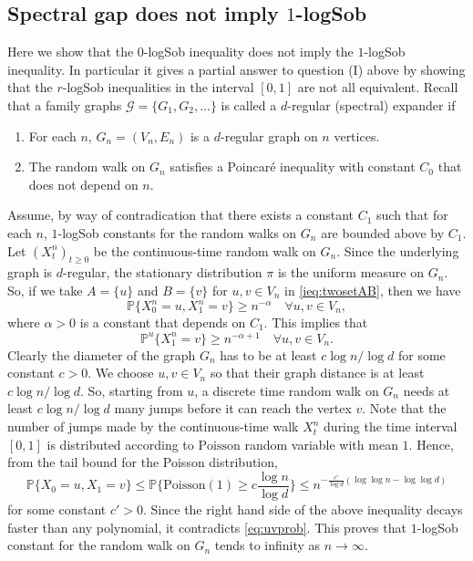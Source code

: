 \documentclass[11pt]{amsart}
\newcommand{\PP}{\mathbb{P}}
\newcommand{\1}{\mathbf{1}}
\theoremstyle{definition}
\theoremstyle{plain}
\theoremstyle{remark}
\numberwithin{equation}{section}
\begin{document}
\subsection{Spectral gap does not imply $1$-logSob}
Here we show that the $0$-logSob inequality does not imply the $1$-logSob inequality. In particular it gives a partial answer to question (I) above
by showing that the $r$-logSob inequalities in the interval $[0,1]$ are not all equivalent. 
Recall that a family graphs $\mathcal{G} = \{ G_1, G_2, \ldots \}$ is called a $d$-regular (spectral) expander if
\begin{enumerate}
\item  For each $n$, $G_n =(V_n, E_n)$ is a $d$-regular graph on $n$ vertices.
\item  The random walk on $G_n$ satisfies a Poincar\'{e} inequality with constant $C_0$ that does not depend on $n$.
\end{enumerate}
Assume, by way of contradication that there exists a constant $C_1$ such that for each $n$, $1$-logSob constants for the random walks on $G_n$ are bounded above by $C_1$.  Let $(X^n_t)_{ t \ge 0}$  be the continuous-time random walk on $G_n$. Since the underlying graph is $d$-regular, the stationary distribution $\pi$ is the uniform measure on $G_n$. So, if we take $A=\{u\}$ and $B = \{ v\}$ for $u, v \in V_n$ in \eqref{ieq:twosetAB}, then  we have
\[  \PP \{ X^n_0 =u, X^n_1 = v\} \ge n^{ - \alpha} \quad \forall u, v \in V_n, \]
where $\alpha >0$ is a constant that depends on $C_1$. This implies that
\begin{equation}\label{eq:uvprob}
 \PP^u\{ X^n_1 = v\} \ge n^{ - \alpha +1} \quad \forall u, v \in V_n.
 \end{equation}
 Clearly the diameter of the graph $G_n$ has to be at least  $c \log n / \log d$ for some constant $c>0$. We choose $u, v \in V_n$ so that their graph distance is at least $c \log n /\log d$. So, starting from $u$, a discrete time random walk on $G_n$ needs at least $c \log n / \log d$ many jumps before it can reach the vertex $v$. Note that the number of jumps made by the continuous-time walk $X^n_t$ during the time interval $[0,1]$ is distributed according to $\mathrm{Poisson}$ random variable with mean $1$. Hence,  from the tail bound for the Poisson distribution,
\[  \PP \{ X_0 =u, X_1 = v\} \le \PP\{ \mathrm{Poisson}(1) \ge c \frac{\log n}{\log d} \} \le 
n^{-\frac{c'}{\log d}(\log \log n - \log \log d)}
  \]
for some constant $c'>0$. Since the right hand side of the above inequality decays faster than any polynomial, it contradicts
\eqref{eq:uvprob}. This proves that $1$-logSob constant for the random walk on $G_n$ tends to infinity as $n \to \infty$.
\end{document}
